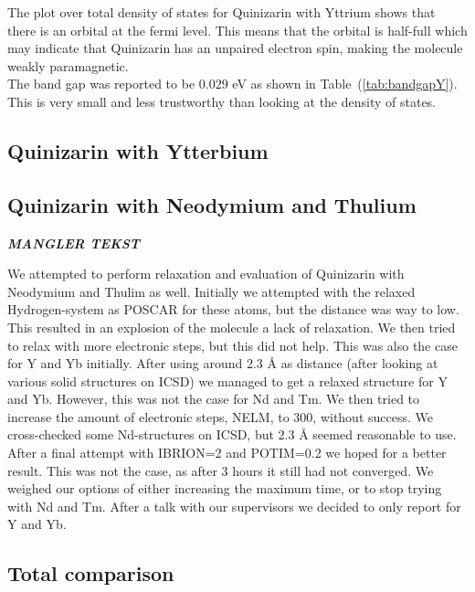 \documentclass{article}
\begin{document}
    The plot over total density of states for Quinizarin with Yttrium shows that there is an orbital at the fermi level. This means that the orbital is half-full which may indicate that Quinizarin has an unpaired electron spin, making the molecule weakly paramagnetic. \\

    The band gap was reported to be $0.029$ eV as shown in Table~(\ref{tab:bandgapY}). This is very small and less trustworthy than looking at the density of states.





  \subsection{Quinizarin with Ytterbium}








  \subsection{Quinizarin with Neodymium and Thulium}

    \textbf{\textit{MANGLER TEKST}}

    We attempted to perform relaxation and evaluation of Quinizarin with Neodymium and Thulim as well. Initially we attempted with the relaxed Hydrogen-system as POSCAR for these atoms, but the distance was way to low. This resulted in an explosion of the molecule a lack of relaxation. We then tried to relax with more electronic steps, but this did not help. This was also the case for Y and Yb initially. After using around 2.3 Å as distance (after looking at various solid structures on ICSD) we managed to get a relaxed structure for Y and Yb. However, this was not the case for Nd and Tm. We then tried to increase the amount of electronic steps, NELM, to 300, without success. We cross-checked some Nd-structures on ICSD, but 2.3 Å seemed reasonable to use. After a final attempt with IBRION=2 and POTIM=0.2 we hoped for a better result. This was not the case, as after 3 hours it still had not converged. We weighed our options of either increasing the maximum time, or to stop trying with Nd and Tm. After a talk with our supervisors we decided to only report for Y and Yb.


  \subsection{Total comparison}
\end{document}
